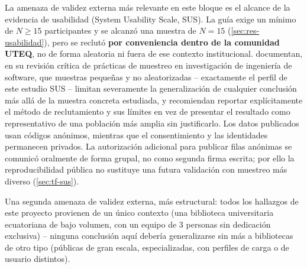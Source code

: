 La amenaza de validez externa más relevante en este bloque es el alcance
de la evidencia de usabilidad (System Usability Scale, SUS). La guía
exige un mínimo de $N\geq15$ participantes y se alcanzó una muestra de
$N=15$ (\autoref{sec:res-usabilidad}), pero se reclutó \textbf{por
conveniencia dentro de la comunidad UTEQ}, no de forma aleatoria ni fuera
de ese contexto
institucional. \citet{baltes2022sampling} documentan, en su revisión
crítica de prácticas de muestreo en investigación de ingeniería de
software, que muestras pequeñas y no aleatorizadas -- exactamente el
perfil de este estudio SUS -- limitan severamente la
generalización de cualquier conclusión más allá de la muestra concreta
estudiada, y recomiendan reportar explícitamente el método de
reclutamiento y sus límites en vez de presentar el resultado como
representativo de una población más amplia sin justificarlo. Los datos
publicados usan códigos anónimos, mientras que el consentimiento y las
identidades permanecen privados. La autorización adicional para publicar
filas anónimas se comunicó oralmente de forma grupal, no como segunda firma
escrita; por ello la reproducibilidad pública no sustituye una futura
validación con muestreo más diverso (\autoref{sec:tf-sus}).

Una segunda amenaza de validez externa, más estructural: todos los
hallazgos de este proyecto provienen de un único contexto (una biblioteca
universitaria ecuatoriana de bajo volumen, con un equipo de 3 personas
sin dedicación exclusiva) -- ninguna conclusión aquí debería
generalizarse sin más a bibliotecas de otro tipo (públicas de gran
escala, especializadas, con perfiles de carga o de usuario distintos).

